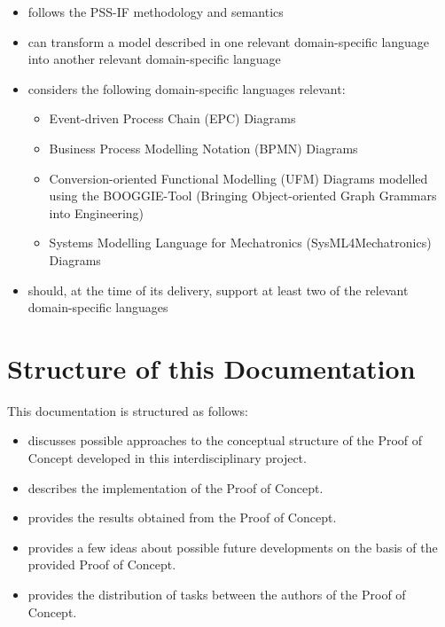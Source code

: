 \begin{itemize}
\item follows the PSS-IF methodology and semantics
\item can transform a model described in one relevant domain-specific language into another relevant domain-specific language
\item considers the following domain-specific languages relevant:
	\begin{itemize}
	\item Event-driven Process Chain (EPC) Diagrams
	\item Business Process Modelling Notation (BPMN) Diagrams
	\item Conversion-oriented Functional Modelling (UFM) Diagrams modelled using the BOOGGIE-Tool (Bringing Object-oriented Graph Grammars into Engineering)
	\item Systems Modelling Language for Mechatronics (SysML4Mechatronics) Diagrams
	\end{itemize}
\item should, at the time of its delivery, support at least two of the relevant domain-specific languages
\end{itemize} 

\section*{Structure of this Documentation}

This documentation is structured as follows:

\begin{itemize}
\item \textbf{} discusses possible approaches to the conceptual structure of the Proof of Concept developed in this interdisciplinary project.
\item \textbf{} describes the implementation of the Proof of Concept.
\item \textbf{} provides the results obtained from the Proof of Concept.
\item \textbf{} provides a few ideas about possible future developments on the basis of the provided Proof of Concept.
\item \textbf{} provides the distribution of tasks between the authors of the Proof of Concept.
\end{itemize}


